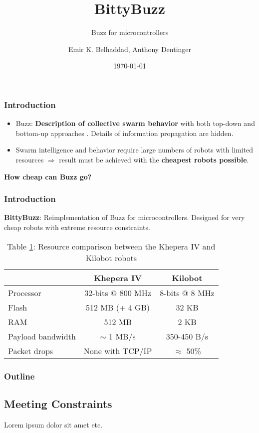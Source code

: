 \documentclass{beamer}
\title{BittyBuzz}
\subtitle{Buzz for microcontrollers}
\author{Emir K. Belhaddad, Anthony Dentinger}
\date{\today}
\begin{document}
	\begin{frame}
		\titlepage
	\end{frame}
	\begin{frame}
		\frametitle{Introduction}
		\begin{itemize}
			\item Buzz: \textbf{Description of collective swarm behavior} with both top-down and bottom-up approaches \cite{buzz_arxiv}. Details of information propagation are hidden.
			\item Swarm intelligence and behavior require large numbers of robots with limited resources $\Rightarrow$ result must be achieved with the \textbf{cheapest robots possible}.
		\end{itemize}

		\centering \Large
		\textbf{How cheap can Buzz go?}
	\end{frame}
	\begin{frame}
		\frametitle{Introduction}
		\textbf{BittyBuzz}: Reimplementation of Buzz for microcontrollers. Designed for very cheap robots with extreme resource constraints.
		
		\begin{table}
			\begin{tabular}{l|c|c}
				                  & Khepera IV        & Kilobot\\
                \hline
				Processor         & 32-bits @ 800 MHz & 8-bits @ 8 MHz\\
				Flash             & 512 MB (+ 4 GB)   & 32 KB\\
				RAM               & 512 MB            & 2 KB\\
				Payload bandwidth & $\sim$ 1 MB/s     & 350-450 B/s\\
				Packet drops      & None with TCP/IP  & $\approx$ 50\%
			\end{tabular}
			\caption{
				\label{table:khepera kilobot comparison}Table \ref{table:khepera kilobot comparison}: Resource comparison between the Khepera IV and Kilobot robots \cite{khepera_specs}}
		\end{table}
	\end{frame}
	\begin{frame}
		\frametitle{Outline}
		\tableofcontents
	\end{frame}
	\begin{frame}
		\section{Meeting Constraints}
		Lorem ipsum dolor sit amet etc.
	\end{frame}
\end{document}

